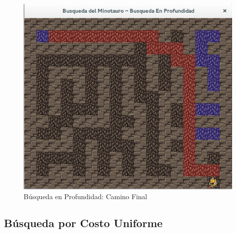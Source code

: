 \documentclass[letter, titlepage, 10pt]{article}
\begin{document}
\begin{appendices}
  \begin{figure}[H]
    \begin{center}
        \includegraphics[scale = 0.4]{images/bep_03}
        \caption{Búsqueda en Profundidad: Camino Final}
    \end{center}
\end{figure}

  
  \subsection{Búsqueda por Costo Uniforme}
  

\end{appendices}
\end{document}
